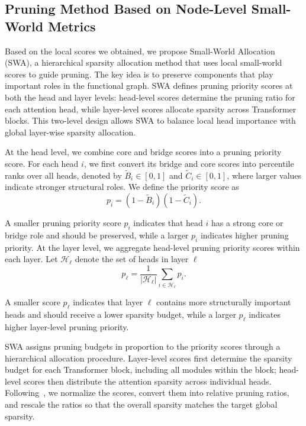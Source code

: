 \subsection{Pruning Method Based on Node-Level Small-World Metrics}
\label{sec:pruning}

Based on the local scores we obtained, we propose Small-World Allocation (SWA), a hierarchical sparsity allocation method that uses local small-world scores to guide pruning. The key idea is to preserve components that play important roles in the functional graph. 
SWA defines pruning priority scores at both the head and layer levels: head-level scores determine the pruning ratio for each attention head, while layer-level scores allocate sparsity across Transformer blocks. This two-level design allows SWA to balance local head importance with global layer-wise sparsity allocation.

At the head level, we combine core and bridge scores into a pruning priority score. For each head $i$, we first convert its bridge and core scores into percentile ranks over all heads, denoted by $\tilde{B}_i \in [0,1]$ and $\tilde{C}_i \in [0,1]$, where larger values indicate stronger structural roles. We define the priority score as
\begin{equation}
p_i = (1-\tilde{B}_i)(1-\tilde{C}_i).
\end{equation}

A smaller pruning priority score $p_i$ indicates that head $i$ has a strong core or bridge role and should be preserved, while a larger $p_i$ indicates higher pruning priority. At the layer level, we aggregate head-level pruning priority scores within each layer. Let $\mathcal{H}_\ell$ denote the set of heads in layer $\ell$
\begin{equation}
p_\ell =
\frac{1}{|\mathcal{H}_\ell|}
\sum_{i\in \mathcal{H}_\ell}
p_i .
\end{equation}

A smaller score $p_\ell$ indicates that layer $\ell$ contains more structurally important heads and should receive a lower sparsity budget, while a larger $p_\ell$ indicates higher layer-level pruning priority.

SWA assigns pruning budgets in proportion to the priority scores through a hierarchical allocation procedure. Layer-level scores first determine the sparsity budget for each Transformer block, including all modules within the block; head-level scores then distribute the attention sparsity across individual heads. Following~\cite{hu2025eigenspectrum}, we normalize the scores, convert them into relative pruning ratios, and rescale the ratios so that the overall sparsity matches the target global sparsity.
